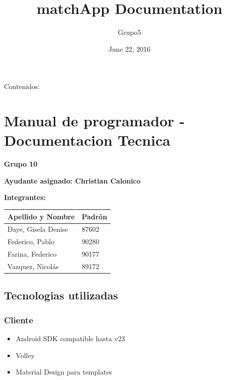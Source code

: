 \documentclass[letterpaper,10pt,english]{sphinxmanual}
\title{matchApp Documentation}
\date{June 22, 2016}
\author{Grupo5}
\begin{document}
\maketitle
\tableofcontents
{}\label{index::doc}


Contenidos:


\chapter{Manual de programador - Documentacion Tecnica}
\label{manuals::doc}\label{manuals:manual-de-programador-documentacion-tecnica}\label{manuals:documentacion-de-matchapp}
\textbf{Grupo 10}

\textbf{Ayudante asignado: Christian Calonico}

\textbf{Integrantes:}

\begin{tabulary}{\linewidth}{|L|L|}
\hline
\textsf{\relax 
Apellido y Nombre
} & \textsf{\relax 
Padrón
}\\
\hline
Daye, Gisela Denise
 & 
87602
\\
\hline
Federico, Pablo
 & 
90280
\\
\hline
Farina, Federico
 & 
90177
\\
\hline
Vazquez, Nicolás
 & 
89172
\\
\hline\end{tabulary}



\section{Tecnologias utilizadas}
\label{manuals:tecnologias-utilizadas}

\subsection{Cliente}
\label{manuals:cliente}\begin{itemize}
\item {} 
Android SDK compatible hasta v23

\item {} 
Volley

\item {} 
Material Design para templates

\end{itemize}
\end{document}
